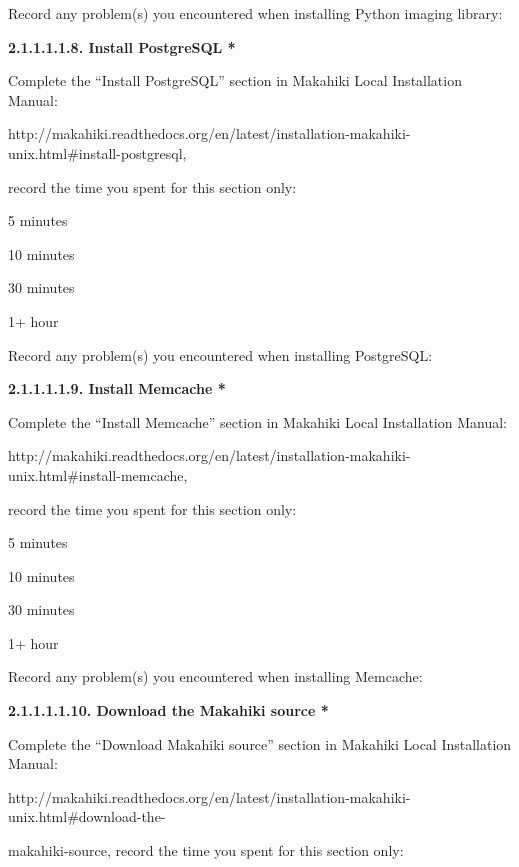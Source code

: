 Record any problem(s) you encountered when installing Python imaging library: 

\underline{\hspace{3cm}}

{\bf 2.1.1.1.1.8. Install PostgreSQL *}

Complete the ``Install PostgreSQL'' section in Makahiki Local Installation Manual:

http://makahiki.readthedocs.org/en/latest/installation-makahiki-unix.html\#install-postgresql, 

record the time you spent for this section only:

\begin{radiobutton}
\item 5 minutes
\item  10 minutes
\item  30 minutes
\item  1+ hour
\end{radiobutton}

Record any problem(s) you encountered when installing PostgreSQL: \underline{\hspace{4cm}}

{\bf 2.1.1.1.1.9. Install Memcache *}

Complete the ``Install Memcache'' section in Makahiki Local Installation Manual:

http://makahiki.readthedocs.org/en/latest/installation-makahiki-unix.html\#install-memcache, 

record the time you spent for this section only:

\begin{radiobutton}
\item 5 minutes
\item  10 minutes
\item  30 minutes
\item  1+ hour
\end{radiobutton}

Record any problem(s) you encountered when installing Memcache: \underline{\hspace{4cm}}

{\bf 2.1.1.1.1.10. Download the Makahiki source *}

Complete the ``Download Makahiki source'' section in Makahiki Local Installation Manual:

http://makahiki.readthedocs.org/en/latest/installation-makahiki-unix.html\#download-the-

makahiki-source, record the time you spent for this section only:

